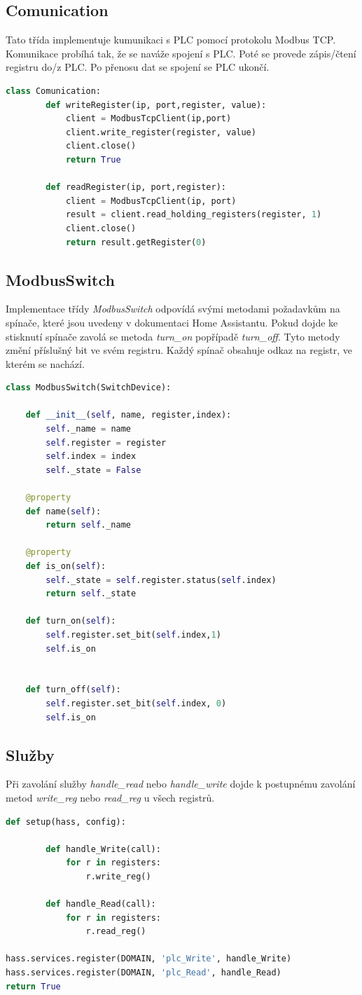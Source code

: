 \documentclass[a4paper,12pt,czech,bibliography=totoc]{scrbook}
\begin{document}
\subsection{Comunication}
Tato třída implementuje kumunikaci s PLC pomocí protokolu Modbus TCP. Komunikace probíhá tak, že se naváže spojení s PLC. Poté se provede zápis/čtení registru do/z PLC. Po přenosu dat se spojení se PLC ukončí.
\begin{lstlisting}[language=Python]
	class Comunication:
		def writeRegister(ip, port,register, value):
			client = ModbusTcpClient(ip,port)
			client.write_register(register, value)
			client.close()
			return True

		def readRegister(ip, port,register):
			client = ModbusTcpClient(ip, port)
			result = client.read_holding_registers(register, 1)
			client.close()
			return result.getRegister(0)

\end{lstlisting}
\subsection{ModbusSwitch}
Implementace třídy \textit{ModbusSwitch} odpovídá svými metodami požadavkům na spínače, které jsou uvedeny v dokumentaci Home Assistantu. Pokud dojde ke stisknutí spínače zavolá se metoda \textit{turn\_on} popřípadě \textit{turn\_off}. Tyto metody změní příslušný bit ve svém registru. Každý spínač obsahuje odkaz na registr, ve kterém se nachází.
\begin{lstlisting}[language=Python]
class ModbusSwitch(SwitchDevice):

	def __init__(self, name, register,index):
		self._name = name
		self.register = register
		self.index = index
		self._state = False

	@property
	def name(self):
		return self._name

	@property
	def is_on(self):
		self._state = self.register.status(self.index)
		return self._state

	def turn_on(self):
		self.register.set_bit(self.index,1)
		self.is_on


	def turn_off(self):
		self.register.set_bit(self.index, 0)
		self.is_on
\end{lstlisting}

\subsection{Služby}
Při zavolání služby \textit{handle\_read} nebo \textit{handle\_write} dojde k postupnému zavolání metod \textit{write\_reg} nebo  \textit{read\_reg} u všech registrů.
\begin{lstlisting}[language=Python]
	def setup(hass, config):

		def handle_Write(call):
			for r in registers:
				r.write_reg()

		def handle_Read(call):
			for r in registers:
				r.read_reg()

hass.services.register(DOMAIN, 'plc_Write', handle_Write)
hass.services.register(DOMAIN, 'plc_Read', handle_Read)	
return True
\end{lstlisting}
\end{document}
